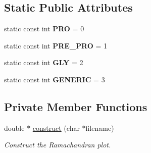\subsection*{Static Public Attributes}
\begin{DoxyCompactItemize}
\item 
\hypertarget{classRamachandranPlot_a2dbb64dc6f788952b725d8401c0936e0}{static const int {\bfseries P\-R\-O} = 0}\label{classRamachandranPlot_a2dbb64dc6f788952b725d8401c0936e0}

\item 
\hypertarget{classRamachandranPlot_a975ab2d49eeb7cf60a7b6b990cb2c706}{static const int {\bfseries P\-R\-E\-\_\-\-P\-R\-O} = 1}\label{classRamachandranPlot_a975ab2d49eeb7cf60a7b6b990cb2c706}

\item 
\hypertarget{classRamachandranPlot_a26a068e7bfe44b31d4f74128260f500f}{static const int {\bfseries G\-L\-Y} = 2}\label{classRamachandranPlot_a26a068e7bfe44b31d4f74128260f500f}

\item 
\hypertarget{classRamachandranPlot_af0c0a68977085e86138c6adf32ed9753}{static const int {\bfseries G\-E\-N\-E\-R\-I\-C} = 3}\label{classRamachandranPlot_af0c0a68977085e86138c6adf32ed9753}

\end{DoxyCompactItemize}
\subsection*{Private Member Functions}
\begin{DoxyCompactItemize}
\item 
double $\ast$ \hyperlink{classRamachandranPlot_a742cd67cdd45fdeae7003958114b1502}{construct} (char $\ast$filename)
\begin{DoxyCompactList}\small\item\em Construct the Ramachandran plot. \end{DoxyCompactList}\end{DoxyCompactItemize}
